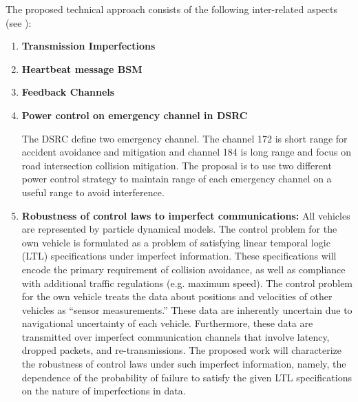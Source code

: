 The proposed technical approach consists of the following inter-related aspects 
(see ):
%
\begin{enumerate}[1.]
	\listformat
	\item \textbf{Transmission Imperfections}
	
	\item \textbf{Heartbeat message BSM }
	
	
	\item{\textbf{Feedback Channels}}
	\item \textbf{Power control on emergency channel in DSRC }
	
	The DSRC define  two emergency channel. The channel 172 is short range for accident avoidance and mitigation and channel 184 is long range and focus on road intersection collision mitigation. The proposal is to use two different power control strategy to maintain  range of each emergency channel on a useful range to avoid interference.  
	
	\item \textbf{Robustness of control laws to imperfect communications:} 
	All vehicles are represented by particle dynamical models.
	The control problem for the own vehicle is formulated as a problem of
	satisfying linear temporal logic (LTL) specifications under imperfect 
	information. These specifications will encode the primary requirement
	of collision avoidance, as well as compliance with additional traffic
	regulations (e.g. maximum speed). The control problem for the own vehicle 
	treats the data about positions and velocities of other vehicles as ``sensor 
	measurements.'' These data are inherently uncertain due to navigational 
	uncertainty of each vehicle. Furthermore, these data are transmitted over 
	imperfect communication channels that involve latency, dropped packets, and 
	re-transmissions. The proposed work will characterize the robustness of control 
	laws under such imperfect information, namely, the dependence of the 
	probability of failure to satisfy the given LTL specifications on the 
	nature of imperfections in data.
\end{enumerate}
